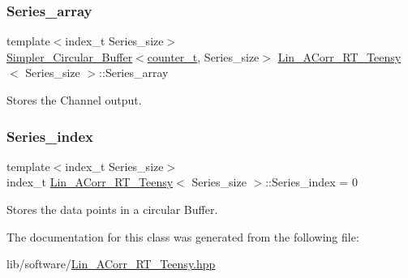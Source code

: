 \mbox{\label{classLin__ACorr__RT__Teensy_a9a619d1a74076f0bac8b7f03acebbb75}} 
\subsubsection{\texorpdfstring{Series\+\_\+array}{Series\_array}}
{\footnotesize\ttfamily template$<$index\+\_\+t Series\+\_\+size$>$ \\
\hyperlink{classSimpler__Circular__Buffer}{Simpler\+\_\+\+Circular\+\_\+\+Buffer}$<$\hyperlink{types_8hpp_ac89ac912f524b3e3fa3720ea55fec966}{counter\+\_\+t}, Series\+\_\+size$>$ \hyperlink{classLin__ACorr__RT__Teensy}{Lin\+\_\+\+A\+Corr\+\_\+\+R\+T\+\_\+\+Teensy}$<$ Series\+\_\+size $>$\+::Series\+\_\+array}



Stores the Channel output. 

\mbox{\label{classLin__ACorr__RT__Teensy_a495539383a4cab5ff611545361600599}} 
\subsubsection{\texorpdfstring{Series\+\_\+index}{Series\_index}}
{\footnotesize\ttfamily template$<$index\+\_\+t Series\+\_\+size$>$ \\
index\+\_\+t \hyperlink{classLin__ACorr__RT__Teensy}{Lin\+\_\+\+A\+Corr\+\_\+\+R\+T\+\_\+\+Teensy}$<$ Series\+\_\+size $>$\+::Series\+\_\+index = 0}



Stores the data points in a circular Buffer. 



The documentation for this class was generated from the following file\+:\begin{DoxyCompactItemize}
\item 
lib/software/\hyperlink{Lin__ACorr__RT__Teensy_8hpp}{Lin\+\_\+\+A\+Corr\+\_\+\+R\+T\+\_\+\+Teensy.\+hpp}\end{DoxyCompactItemize}
